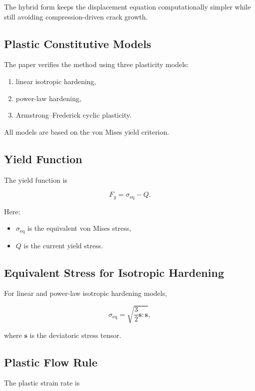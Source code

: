﻿\documentclass[11pt,a4paper]{article}
\begin{document}
The hybrid form keeps the displacement equation computationally simpler while still avoiding compression-driven crack growth.

\subsection{Plastic Constitutive Models}

The paper verifies the method using three plasticity models:

\begin{enumerate}[leftmargin=*]
    \item linear isotropic hardening,
    \item power-law hardening,
    \item Armstrong--Frederick cyclic plasticity.
\end{enumerate}

All models are based on the von Mises yield criterion.

\subsection{Yield Function}

The yield function is

\[
F_y
=
\sigma_{\mathrm{eq}} - Q.
\]

Here:

\begin{itemize}[leftmargin=*]
    \item $\sigma_{\mathrm{eq}}$ is the equivalent von Mises stress,
    \item $Q$ is the current yield stress.
\end{itemize}

\subsection{Equivalent Stress for Isotropic Hardening}

For linear and power-law isotropic hardening models,

\[
\sigma_{\mathrm{eq}}
=
\sqrt{
\frac{3}{2}
\bm{s}:\bm{s}
},
\]

where $\bm{s}$ is the deviatoric stress tensor.

\subsection{Plastic Flow Rule}

The plastic strain rate is
\end{document}
